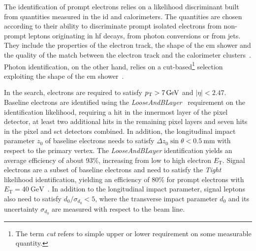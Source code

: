 The identification of prompt electrons relies on a likelihood discriminant built from quantities measured in the \gls{id} and calorimeters.
The quantities are chosen according to their ability to discriminate prompt isolated electrons from non-prompt leptons originating in \eg \gls{hf} decays, from photon conversions or from jets.
They include the properties of the electron track, the shape of the \gls{em} shower and the quality of the match between the electron track and the calorimeter clusters~\cite{PERF-2017-01}.
Photon identification, on the other hand, relies on a cut-based\footnote{The term \textit{cut} refers to simple upper or lower requirement on some measurable quantity.} selection exploiting the shape of the \gls{em} shower~\cite{EGAM-2018-01}.

In the \onelepton search, electrons are required to satisfy $p_{\textrm{T}} > \SI{7}{GeV}$ and $\vert\eta\vert<2.47$.
Baseline electrons are identified using the \textit{LooseAndBLayer}~\cite{PERF-2017-01} requirement on the identification likelihood, requiring a hit in the innermost layer of the pixel detector, at least two additional hits in the remaining pixel layers and seven hits in the pixel and \gls{sct} detectors combined.
In addition, the longitudinal impact parameter $z_0$ of baseline electrons needs to satisfy $\Delta z_0\sin\theta < \SI{0.5}{\milli\meter}$ with respect to the primary vertex.
The \textit{LooseAndBLayer} identification yields an average efficiency of about 93\%, increasing from low to high electron $E_\mathrm{T}$.
Signal electrons are a subset of baseline electrons and need to satisfy the \textit{Tight}~\cite{PERF-2017-01} likelihood identification, yielding an efficiency of 80\% for prompt electrons with $E_\mathrm{T}=\SI{40}{\GeV}$~\cite{PERF-2017-01}.
In addition to the longitudinal impact parameter, signal leptons also need to satisfy $d_0/\sigma_{d_0} < 5$, where the transverse impact parameter $d_0$ and its uncertainty $\sigma_{d_0}$ are measured with respect to the beam line. 

